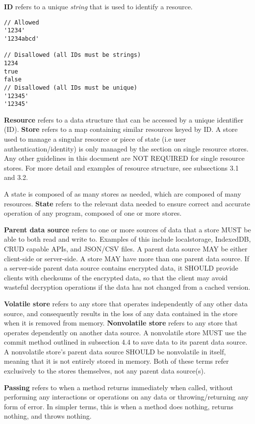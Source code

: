 \documentclass{article}
\begin{document}
\textbf{ID} refers to a unique \emph{string} that is used to identify a resource.

\begin{lstlisting}[caption=ID]
// Allowed
'1234'
'1234abcd'

// Disallowed (all IDs must be strings)
1234
true
false
// Disallowed (all IDs must be unique)
'12345'
'12345'
\end{lstlisting}

\textbf{Resource} refers to a data structure that can be accessed by a unique identifier (ID). \textbf{Store} refers to a map containing similar resources keyed by ID. A store used to manage a singular resource or piece of state (i.e user authentication/identity) is only managed by the section on single resource stores. Any other guidelines in this document are NOT REQUIRED for single resource stores. For more detail and examples of resource structure, see subsections 3.1 and 3.2.

A state is composed of as many stores as needed, which are composed of many resources. \textbf{State} refers to the relevant data needed to ensure correct and accurate operation of any program, composed of one or more stores.

\textbf{Parent data source} refers to one or more sources of data that a store MUST be able to both read and write to. Examples of this include localstorage, IndexedDB, CRUD capable APIs, and JSON/CSV files. A parent data source MAY be either client-side or server-side. A store MAY have more than one parent data source. If a server-side parent data source contains encrypted data, it SHOULD provide clients with checksums of the encrypted data, so that the client may avoid wasteful decryption operations if the data has not changed from a cached version.

\textbf{Volatile store} refers to any store that operates independently of any other data source, and consequently results in the loss of any data contained in the store when it is removed from memory. \textbf{Nonvolatile store} refers to any store that operates dependently on another data source. A nonvolatile store MUST use the commit method outlined in subsection 4.4 to save data to its parent data source. A nonvolatile store's parent data source SHOULD be nonvolatile in itself, meaning that it is not entirely stored in memory. Both of these terms refer exclusively to the stores themselves, not any parent data source(s).

\textbf{Passing} refers to when a method returns immediately when called, without performing any interactions or operations on any data or throwing/returning any form of error. In simpler terms, this is when a method does nothing, returns nothing, and throws nothing.
\end{document}
